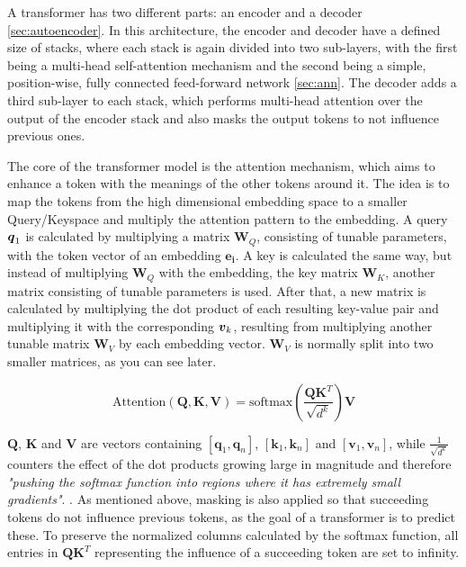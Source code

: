 A transformer has two different parts: an encoder and a decoder \autoref{sec:autoencoder}. In this architecture, the encoder and decoder have a defined size of stacks, where each stack is again divided into two sub-layers, with the first being a multi-head self-attention mechanism and the second being a simple, position-wise, fully connected feed-forward network \autoref{sec:ann}. The decoder adds a third sub-layer to each stack, which performs multi-head attention over the output of the encoder stack and also masks the output tokens to not influence previous ones.\cite{vaswani2023attentionneed}  

The core of the transformer model is the attention mechanism, which aims to enhance a token with the meanings of the other tokens around it. The idea is to map the tokens from the high dimensional embedding space to a smaller Query/Keyspace and multiply the attention pattern to the embedding. A query $\boldsymbol{q}_1$ is calculated by multiplying a matrix $\boldsymbol{W}_Q$, consisting of tunable parameters, with the token vector of an embedding $\boldsymbol{e_i}$. A key is calculated the same way, but instead of multiplying $\boldsymbol{W}_Q$ with the embedding, the key matrix $\boldsymbol{W}_K$, another matrix consisting of tunable parameters is used. After that, a new matrix is calculated by multiplying the dot product of each resulting key-value pair and multiplying it with the corresponding $\boldsymbol{v}_k$, resulting from multiplying another tunable matrix $\boldsymbol{W}_V$ by each embedding vector. $\boldsymbol{W}_V$ is normally split into two smaller matrices, as you can see later. \cite{vaswani2023attentionneed} \cite{youtube3blue1brown}

\begin{equation}
    \text{Attention}(\boldsymbol{Q}, \boldsymbol{K}, \boldsymbol{V}) = \text{softmax}\left(\frac{\boldsymbol{Q}\boldsymbol{K}^T}{\sqrt{d^k}}\right)\boldsymbol{V}
\end{equation}

$\boldsymbol{Q}$, $\boldsymbol{K}$ and $\boldsymbol{V}$ are vectors containing $[\boldsymbol{q}_1, \boldsymbol{q}_n]$, $[\boldsymbol{k}_1, \boldsymbol{k}_n]$ and $[\boldsymbol{v}_1, \boldsymbol{v}_n]$, while $\frac{1}{\sqrt{d^k}}$ counters the effect of the dot products growing large in magnitude and therefore \textit{"pushing the softmax function into regions where it has extremely small gradients"}. \cite{vaswani2023attentionneed}. As mentioned above, masking is also applied so that succeeding tokens do not influence previous tokens, as the goal of a transformer is to predict these. To preserve the normalized columns calculated by the softmax function, all entries in $\boldsymbol{Q}\boldsymbol{K}^T$ representing the influence of a succeeding token are set to infinity. \cite{vaswani2023attentionneed}

